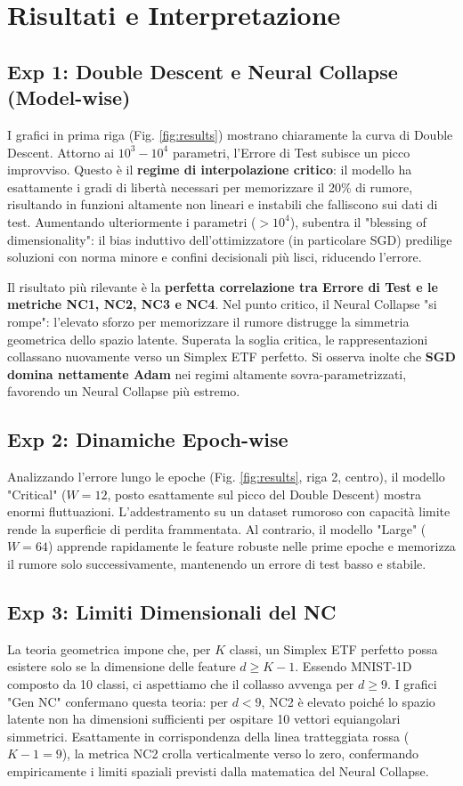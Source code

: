 \documentclass[10pt,twocolumn,letterpaper]{article}
\begin{document}
\section{Risultati e Interpretazione}

\subsection{Exp 1: Double Descent e Neural Collapse (Model-wise)}
I grafici in prima riga (Fig. \ref{fig:results}) mostrano chiaramente la curva di Double Descent. Attorno ai $10^3-10^4$ parametri, l'Errore di Test subisce un picco improvviso. Questo è il \textbf{regime di interpolazione critico}: il modello ha esattamente i gradi di libertà necessari per memorizzare il 20\% di rumore, risultando in funzioni altamente non lineari e instabili che falliscono sui dati di test.
Aumentando ulteriormente i parametri ($>10^4$), subentra il "blessing of dimensionality": il bias induttivo dell'ottimizzatore (in particolare SGD) predilige soluzioni con norma minore e confini decisionali più lisci, riducendo l'errore.

Il risultato più rilevante è la \textbf{perfetta correlazione tra Errore di Test e le metriche NC1, NC2, NC3 e NC4}. Nel punto critico, il Neural Collapse "si rompe": l'elevato sforzo per memorizzare il rumore distrugge la simmetria geometrica dello spazio latente. Superata la soglia critica, le rappresentazioni collassano nuovamente verso un Simplex ETF perfetto. Si osserva inolte che \textbf{SGD domina nettamente Adam} nei regimi altamente sovra-parametrizzati, favorendo un Neural Collapse più estremo.

\subsection{Exp 2: Dinamiche Epoch-wise}
Analizzando l'errore lungo le epoche (Fig. \ref{fig:results}, riga 2, centro), il modello "Critical" ($W=12$, posto esattamente sul picco del Double Descent) mostra enormi fluttuazioni. L'addestramento su un dataset rumoroso con capacità limite rende la superficie di perdita frammentata. Al contrario, il modello "Large" ($W=64$) apprende rapidamente le feature robuste nelle prime epoche e memorizza il rumore solo successivamente, mantenendo un errore di test basso e stabile.

\subsection{Exp 3: Limiti Dimensionali del NC}
La teoria geometrica impone che, per $K$ classi, un Simplex ETF perfetto possa esistere solo se la dimensione delle feature $d \ge K-1$. Essendo MNIST-1D composto da 10 classi, ci aspettiamo che il collasso avvenga per $d \ge 9$.
I grafici "Gen NC" confermano questa teoria: per $d < 9$, NC2 è elevato poiché lo spazio latente non ha dimensioni sufficienti per ospitare 10 vettori equiangolari simmetrici. Esattamente in corrispondenza della linea tratteggiata rossa ($K-1=9$), la metrica NC2 crolla verticalmente verso lo zero, confermando empiricamente i limiti spaziali previsti dalla matematica del Neural Collapse.
\end{document}
